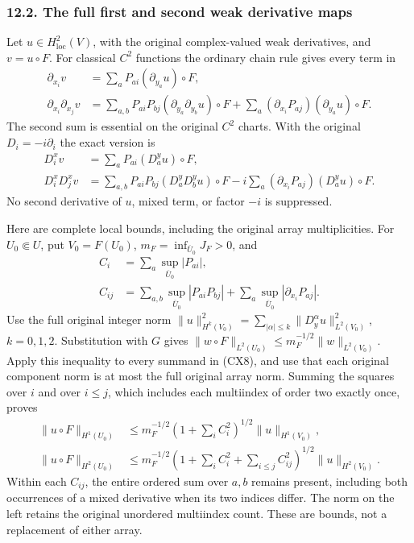 \documentclass[
  11pt,
]{article}
\begin{document}
\subsubsection{12.2. The full first and second weak derivative
maps}\label{the-full-first-and-second-weak-derivative-maps}

Let \(u\in H^2_{\mathrm{loc}}(V)\), with the original complex-valued
weak derivatives, and \(v=u\circ F\). For classical \(C^2\) functions
the ordinary chain rule gives every term in \[
 \begin{split}
 \partial_{x_i}v
  &=\sum_a P_{ai}(\partial_{y_a}u)\circ F,\\
 \partial_{x_i}\partial_{x_j}v
  &=\sum_{a,b}P_{ai}P_{bj}(\partial_{y_a}\partial_{y_b}u)\circ F
      +\sum_a(\partial_{x_i}P_{aj})(\partial_{y_a}u)\circ F .
 \end{split}                                                   \tag{CX7}
\] The second sum is essential on the original \(C^2\) charts. With the
original \(D_i=-i\partial_i\) the exact version is \[
 \begin{split}
 D_i^xv&=\sum_aP_{ai}(D_a^yu)\circ F,\\
 D_i^xD_j^xv
 &=\sum_{a,b}P_{ai}P_{bj}(D_a^yD_b^yu)\circ F
       -i\sum_a(\partial_{x_i}P_{aj})(D_a^yu)\circ F .
 \end{split}                                                   \tag{CX8}
\] No second derivative of \(u\), mixed term, or factor \(-i\) is
suppressed.

Here are complete local bounds, including the original array
multiplicities. For \(U_0\Subset U\), put \(V_0=F(U_0)\),
\(m_F=\inf_{\overline U_0}J_F>0\), and \[
 \begin{split}
 C_i&=\sum_a\sup_{\overline U_0}|P_{ai}|,\\
 C_{ij}&=\sum_{a,b}\sup_{\overline U_0}|P_{ai}P_{bj}|
                 +\sum_a\sup_{\overline U_0}|\partial_{x_i}P_{aj}|.
 \end{split}
\] Use the full original integer norm
\(\|u\|_{H^k(V_0)}^2=\sum_{|\alpha|\leq k}\|D_y^\alpha u\|_{L^2(V_0)}^2\),
\(k=0,1,2\). Substitution with \(G\) gives
\(\|w\circ F\|_{L^2(U_0)}\leq m_F^{-1/2}\|w\|_{L^2(V_0)}\). Apply this
inequality to every summand in (CX8), and use that each original
component norm is at most the full original array norm. Summing the
squares over \(i\) and over \(i\leq j\), which includes each multiindex
of order two exactly once, proves \[
 \begin{split}
 \|u\circ F\|_{H^1(U_0)}
 &\leq m_F^{-1/2}\left(1+\sum_i C_i^2\right)^{1/2}
                   \|u\|_{H^1(V_0)},\\
 \|u\circ F\|_{H^2(U_0)}
 &\leq m_F^{-1/2}
       \left(1+\sum_i C_i^2+\sum_{i\leq j}C_{ij}^2\right)^{1/2}
                   \|u\|_{H^2(V_0)}.                           
 \end{split} \tag{CX9}
\] Within each \(C_{ij}\), the entire ordered sum over \(a,b\) remains
present, including both occurrences of a mixed derivative when its two
indices differ. The norm on the left retains the original unordered
multiindex count. These are bounds, not a replacement of either array.
\end{document}
